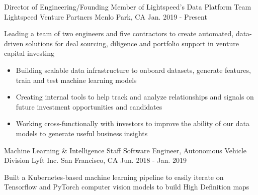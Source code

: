 

\begin{cventries}

  \cventry
    {Director of Engineering/Founding Member of Lightspeed's Data Platform Team} %
    {Lightspeed Venture Partners} %
    {Menlo Park, CA} %
    {Jan. 2019 - Present} %
    {
      \begin{cvitems} %
        \item{Leading a team of two engineers and five contractors to create automated, data-driven solutions for deal sourcing, diligence and portfolio support in venture capital investing}
        \begin{itemize}[label=$\circ$]
          \item{Building scalable data infrastructure to onboard datasets, generate features, train and test machine learning models}
          \item{Creating internal tools to help track and analyze relationships and signals on future investment opportunities and candidates}
          \item{Working cross-functionally with investors to improve the ability of our data models to generate useful business insights}
        \end{itemize}
      \end{cvitems}
    }

  \cventry
    {Machine Learning \& Intelligence Staff Software Engineer, Autonomous Vehicle Division} %
    {Lyft Inc.} %
    {San Francisco, CA} %
    {Jun. 2018 - Jan. 2019} %
    {
      \begin{cvitems} %
        \item{Built a Kubernetes-based machine learning pipeline to easily iterate on Tensorflow and PyTorch computer vision models to build High Definition maps}
      \end{cvitems}
    }


\end{cventries}
